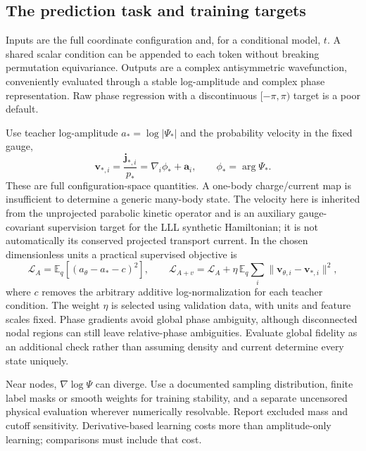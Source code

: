 \documentclass[11pt,letterpaper]{article}
\begin{document}
\subsection{The prediction task and training targets}

Inputs are the full coordinate configuration and, for a conditional model, $t$. A shared scalar condition can be appended to each token without breaking permutation equivariance. Outputs are a complex antisymmetric wavefunction, conveniently evaluated through a stable log-amplitude and complex phase representation. Raw phase regression with a discontinuous $[-\pi,\pi)$ target is a poor default.

Use teacher log-amplitude $a_*=\log|\Psi_*|$ and the probability velocity in the fixed gauge,
\begin{equation}
 \mathbf v_{*,i}=\frac{\mathbf j_{*,i}}{p_*}=\nabla_i\phi_*+\mathbf a_i,
 \qquad \phi_*=\arg\Psi_*.
\end{equation}
These are full configuration-space quantities. A one-body charge/current map is insufficient to determine a generic many-body state. The velocity here is inherited from the unprojected parabolic kinetic operator and is an auxiliary gauge-covariant supervision target for the LLL synthetic Hamiltonian; it is not automatically its conserved projected transport current. In the chosen dimensionless units a practical supervised objective is
\begin{equation}
 \mathcal L_A=\mathbb E_q[(a_\theta-a_*-c)^2],\qquad
 \mathcal L_{A+v}=\mathcal L_A+\eta\,\mathbb E_q\sum_i\|\mathbf v_{\theta,i}-\mathbf v_{*,i}\|^2,
 \label{eq:superloss}
\end{equation}
where $c$ removes the arbitrary additive log-normalization for each teacher condition. The weight $\eta$ is selected using validation data, with units and feature scales fixed. Phase gradients avoid global phase ambiguity, although disconnected nodal regions can still leave relative-phase ambiguities. Evaluate global fidelity as an additional check rather than assuming density and current determine every state uniquely.

Near nodes, $\nabla\log\Psi$ can diverge. Use a documented sampling distribution, finite label masks or smooth weights for training stability, and a separate uncensored physical evaluation wherever numerically resolvable. Report excluded mass and cutoff sensitivity. Derivative-based learning costs more than amplitude-only learning; comparisons must include that cost.
\end{document}
